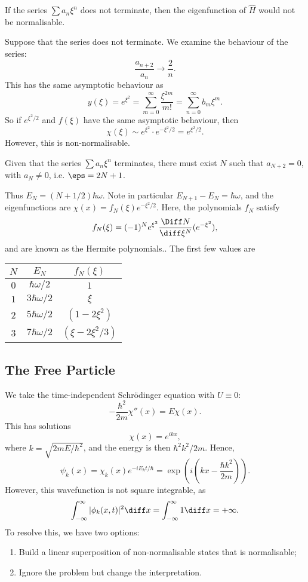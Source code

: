 \documentclass[12pt]{article}
\begin{document}
\begin{proposition}
	If the series $\sum a_n \xi^{n}$ does not terminate, then the eigenfunction of $\hat H$ would not be normalisable.
\end{proposition}

\begin{proofbox}
	Suppose that the series does not terminate. We examine the behaviour of the series:
	\[
	\frac{a_{n+2}}{a_n} \to \frac{2}{n}
	.\]
	This has the same asymptotic behaviour as
	\[
		y(\xi) = e^{\xi ^2} = \sum_{m = 0}^{\infty} \frac{\xi^{2m}}{m!} = \sum_{n = 0}^{\infty} b_m \xi^{m}
	.\]
	So if $e^{\xi^2/2}$ and $f(\xi)$ have the same asymptotic behaviour, then
	\[
		\chi(\xi) \sim e^{\xi^2} \cdot e^{- \xi^2/2} = e^{\xi^2/2}
	.\]
	However, this is non-normalisable.
\end{proofbox}

Given that the series $\sum a_n \xi^{n}$ terminates, there must exist $N$ such that $a_{N + 2} = 0$, with $a_N \neq 0$, i.e. $\eps = 2N+1$.

Thus $E_N = (N+1/2)\hbar \omega$. Note in particular $E_{N+1} - E_N = \hbar \omega$, and the eigenfunctions are $\chi(x) = f_N(\xi) e^{-\xi^2/2}$. Here, the polynomials $f_N$ satisfy
\[
	f_N(\xi) = (-1)^{N} e^{\xi^2} \frac{\Diff N}{\diff \xi^{N}}(e^{-\xi^2})
,\]
and are known as the Hermite polynomials.. The first few values are

\begin{center}
\begin{tabular}{c|c|c}
	$N$ & $E_N$ & $f_N(\xi)$ \\
	\hline
	$0$ & $\hbar \omega/2$ & $1$ \\
	$1$ & $3\hbar\omega/2$ & $\xi$ \\
	$2$ & $5\hbar\omega/2$ & $(1 - 2\xi^2)$ \\
	$3$ & $7\hbar\omega/2$ & $(\xi - 2\xi^2/3)$ \\
\end{tabular}
\end{center}

\subsection{The Free Particle}%
\label{sub:the_free_particle}

We take the time-independent Schr\"{o}dinger equation with $U \equiv 0$:
\[
	-\frac{\hbar^2}{2m} \chi''(x) = E\chi(x)
.\]
This has solutions
\[
	\chi(x) = e^{ikx}
,\]
where $k = \sqrt{2mE/\hbar^2}$, and the energy is then $\hbar^2k^2/2m$. Hence,
\[
	\psi_k(x) = \chi_k(x) e^{-iE_kt/\hbar} = \exp \left( i \left(kx - \frac{\hbar k^2}{2m} \right) \right)
.\]
However, this wavefunction is not square integrable, as
\[
	\int_{-\infty}^{\infty} |\phi_k(x, t)|^2\diff x = \int_{-\infty}^{\infty}1\diff x = +\infty
.\]
To resolve this, we have two options:
\begin{enumerate}[1.]
	\item Build a linear superposition of non-normalisable states that is normalisable;
	\item Ignore the problem but change the interpretation.
\end{enumerate}
\end{document}
